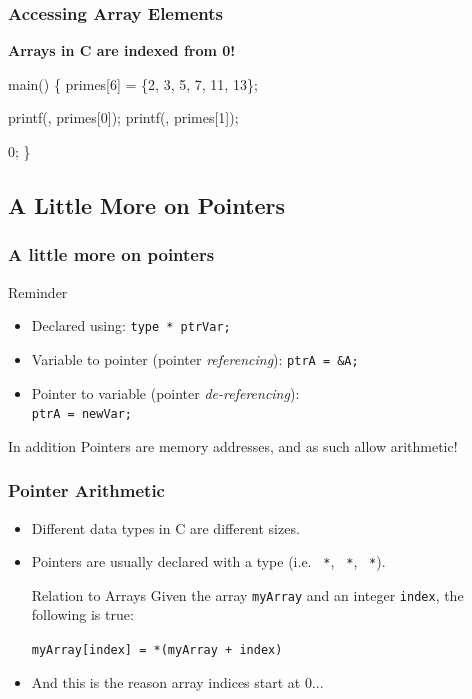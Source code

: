 \documentclass[smaller,table]{beamer}
\begin{document}
\begin{frame}[fragile]
\frametitle{Accessing Array Elements}
\begin{alertblock}{}
\begin{center}
\bf Arrays in C are indexed from 0!
\end{center}
\end{alertblock}
\begin{semiverbatim}
 

 main()
\{
    primes[6] = \{2, 3, 5, 7, 11, 13\};

   printf(, primes[0]);
   printf(, primes[1]);
   
    0;   
\}
\end{semiverbatim}
\end{frame}

\subsection{A Little More on Pointers}
\begin{frame}
\frametitle{A little more on pointers}
\begin{block}{Reminder}
\begin{itemize}
\item Declared using: {\tt type * ptrVar;}
\item Variable to pointer (pointer \emph{referencing}): {\tt ptrA = \&A;}
\item Pointer to variable (pointer \emph{de-referencing}):\\ {\tt *ptrA = newVar;}
\end{itemize}
\end{block}
\begin{exampleblock}{In addition}
Pointers are memory addresses, and as such allow arithmetic!
\end{exampleblock}
\end{frame}

\begin{frame}[fragile]
\frametitle{Pointer Arithmetic}
\begin{itemize}
\item Different data types in C are different sizes.
\item Pointers are usually declared with a type (i.e. {\tt {} *},
{\tt {} *}, {\tt {} *}).

\begin{alertblock}{Relation to Arrays}
Given the array {\tt myArray} and an integer {\tt index}, the following is true:
\begin{center}
\tt myArray[index] = *(myArray + index)
\end{center}
\end{alertblock}

\item And this is the reason array indices start at 0...
\end{itemize}

\end{frame}
\end{document}
